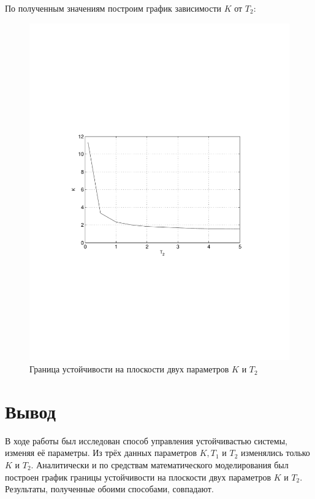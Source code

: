 \documentclass[a4paper, 11pt, russian]{article}
\begin{document}
    По полученным значениям построим график зависимости $K$ от $T_2$:
    \begin{figure}[ht!]
        \centering
        \includegraphics[width = \textwidth]{KT2graph}
        \caption{Граница устойчивости на плоскости двух параметров $K$ и $T_2$}
    \end{figure}
    \clearpage
    \section{Вывод}
    В ходе работы был исследован способ управления устойчивастью системы, изменяя её параметры. Из трёх данных параметров $K, T_1$ и $T_2$ изменялись только $K$ и $T_2$. Аналитически и по средствам математического моделирования был построен график границы устойчивости на плоскости двух параметров $K$ и $T_2$. Результаты, полученные обоими способами, совпадают.
\end{document}
